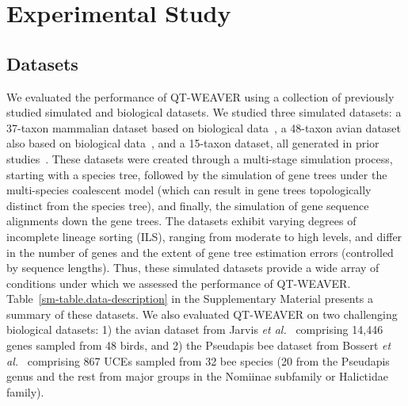 \documentclass[10pt,a4paper]{article}
\begin{document}
\DecMargin{1em}
\ULforem %


\section{Experimental Study}
\subsection{Datasets}
%

We evaluated the performance of QT-WEAVER using a collection of previously studied simulated and biological datasets. We studied three simulated datasets: a 37-taxon mammalian dataset based on biological data~\cite{song-mammal}, a 48-taxon avian dataset also based on biological data~\cite{jarvis2014}, and a 15-taxon dataset, all generated in prior studies~\cite{statistical-binning,bayzid2015weighted}. These datasets were created through a multi-stage simulation process, starting with a species tree, followed by the simulation of gene trees under the multi-species coalescent model (which can result in gene trees topologically distinct from the species tree), and finally, the simulation of gene sequence alignments down the gene trees. The datasets exhibit varying degrees of incomplete lineage sorting (ILS), ranging from moderate to high levels, and differ in the number of genes and the extent of gene tree estimation errors (controlled by sequence lengths). Thus, these simulated datasets provide a wide array of conditions under which we assessed the performance of QT-WEAVER. %
Table~\ref{sm-table.data-description} in the Supplementary Material presents a summary of these datasets. We also evaluated QT-WEAVER on two challenging biological datasets: 1) the avian dataset from Jarvis \textit{et al.}~\cite{jarvis2014} comprising 14,446 genes sampled from 48 birds, and 2) the Pseudapis bee dataset from Bossert \textit{et al.}~\cite{bossert2021gene} comprising 867 UCEs sampled from 32 bee species (20 from the Pseudapis genus and the rest from major groups in the Nomiinae subfamily or Halictidae family).


\end{document}
